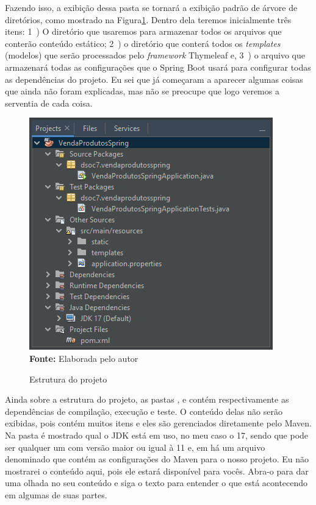 Fazendo isso, a exibição dessa pasta se tornará a exibição padrão de árvore de diretórios, como mostrado na Figura\ref{fig:cap10EstruturaProjetoOK}. Dentro dela teremos inicialmente três itens: 1~) O diretório  que usaremos para armazenar todos os arquivos que conterão conteúdo estático; 2~) o diretório  que conterá todos os \textit{templates} (modelos) que serão processados pelo \textit{framework} Thymeleaf e, 3~) o arquivo  que armazenará todas as configurações que o Spring Boot usará para configurar todas as dependências do projeto. Eu sei que já começaram a aparecer algumas coisas que ainda não foram explicadas, mas não se preocupe que logo veremos a serventia de cada coisa.

\FloatBarrier
\begin{figure}[!htbp]
    \centering
    \caption{Estrutura do projeto}
    \includegraphics[scale=1]{imagens/cap10EstruturaProjetoOK}
    \\\textbf{Fonte:} Elaborada pelo autor
    \label{fig:cap10EstruturaProjetoOK}
\end{figure}
\FloatBarrier

Ainda sobre a estrutura do projeto, as pastas ,  e  contém respectivamente as dependências de compilação, execução e teste. O conteúdo delas não serão exibidas, pois contém muitos itens e eles são gerenciados diretamente pelo Maven. Na pasta  é mostrado qual o JDK está em uso, no meu caso o 17, sendo que pode ser qualquer um com versão maior ou igual à 11 e, em  há um arquivo denominado  que contém as configurações do Maven para o nosso projeto. Eu não mostrarei o conteúdo aqui, pois ele estará disponível para vocês. Abra-o para dar uma olhada no seu conteúdo e siga o texto para entender o que está acontecendo em algumas de suas partes.

